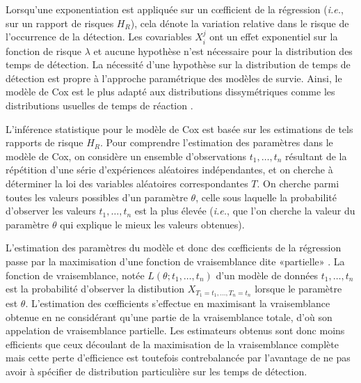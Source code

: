 Lorsqu'une exponentiation est appliquée sur un cœfficient de la régression (\textit{i.e.}, sur un rapport de risques $H_R$), cela dénote la variation relative dans le risque de l'occurrence de la détection. 
Les covariables $X_i^j$ ont un effet exponentiel sur la fonction de risque $\lambda$ et aucune hypothèse n'est nécessaire pour la distribution des temps de détection. 
La nécessité d'une hypothèse sur la distribution de temps de détection est propre à l'approche paramétrique des modèles de survie. 
Ainsi, le modèle de Cox est le plus adapté aux distributions dissymétriques comme les distributions usuelles de temps de réaction \citep{letue2018statistical}. 

L'inférence statistique pour le modèle de Cox est basée sur les estimations de tels rapports de risque $H_R$. 
Pour comprendre l'estimation des paramètres dans le modèle de Cox, on considère un ensemble d'observations $t_1,\ldots,t_n$ résultant de la répétition d'une série d'expériences aléatoires indépendantes, et on cherche à déterminer la loi des variables aléatoires correspondantes $T$. 
On cherche parmi toutes les valeurs possibles d'un paramètre $\theta$, celle sous laquelle la probabilité d'observer les valeurs $t_1,\ldots,t_n$ est la plus élevée (\textit{i.e.}, que l'on cherche la valeur du paramètre $\theta$ qui explique le mieux les valeurs obtenues). 

L’estimation des paramètres du modèle et donc des cœfficients de la régression passe par la maximisation d’une fonction de vraisemblance dite «partielle» \citep{cox1975partial}. 
La fonction de vraisemblance, notée $L(\theta;t_1,\ldots,t_n)$ d'un modèle de données $t_1,\ldots,t_n$ est la probabilité d'observer la distibution $X_{T_1=t_1,\ldots,T_n=t_n}$ lorsque le paramètre est $\theta$. 
L’estimation des cœfficients s’effectue en maximisant la vraisemblance obtenue en ne considérant qu’une partie de la vraisemblance totale, d’où son appelation de vraisemblance partielle. 
Les estimateurs obtenus sont donc moins efficients que ceux découlant de la maximisation de la vraisemblance complète mais cette perte d’efficience est toutefois contrebalancée par l’avantage de ne pas avoir à spécifier de distribution particulière sur les temps de détection. 


